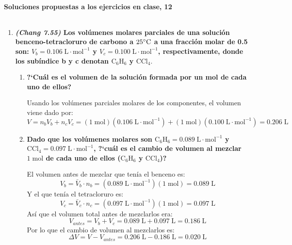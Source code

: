 \documentclass[a4paper,12pt]{article}
\begin{document}

\begin{center}
\HRule \\[0.4cm]
{ \bfseries Soluciones propuestas a los ejercicios en clase, 12}\\ %
\HRule \\[0.4cm]
\end{center}


\begin{enumerate}

 \item \textbf{\textit{(Chang 7.55)} Los vol\'umenes molares parciales de una soluci\'on benceno-tetracloruro de carbono a $25\celsius$ a una fracci\'on molar de 0.5 son: $V_b=0.106\;\mbox{L}\cdot\mbox{mol}^{-1}$ y $V_c=0.100\;\mbox{L}\cdot\mbox{mol}^{-1}$, respectivamente, donde los sub\'indice b y c denotan $\mbox{C}_6\mbox{H}_6$ y $\mbox{CCl}_4$}.
 \begin{enumerate}
  \item \textbf{?`Cu\'al es el volumen de la soluci\'on formada por un mol de cada uno de ellos?}

Usando los vol\'umenes parciales molares de los componentes, el volumen viene dado por:
$$V=n_bV_b+n_cV_c=(1\;\mbox{mol})(0.106\;\mbox{L}\cdot\mbox{mol}^{-1})+(1\;\mbox{mol})(0.100\;\mbox{L}\cdot\mbox{mol}^{-1})=0.206\;\mbox{L}$$

  \item \textbf{Dado que los vol\'umenes molares son $\mbox{C}_6\mbox{H}_6=0.089\;\mbox{L}\cdot\mbox{mol}^{-1}$ y $\mbox{CCl}_4=0.097\;\mbox{L}\cdot\mbox{mol}^{-1}$, ?`cu\'al es el cambio de volumen al mezclar $1\;\mbox{mol}$ de cada uno de ellos ($\mbox{C}_6\mbox{H}_6$ y $\mbox{CCl}_4$)?}

El volumen antes de mezclar que ten\'ia el benceno es: 
$$V_b=\bar{V}_b\cdot n_b=(0.089\;\mbox{L}\cdot\mbox{mol}^{-1})(1\;\mbox{mol})=0.089\;\mbox{L}$$ 
Y el que ten\'ia el tetracloruro es: 
$$V_c=\bar{V}_c\cdot n_c=(0.097\;\mbox{L}\cdot\mbox{mol}^{-1})(1\;\mbox{mol})=0.097\;\mbox{L}$$
As\'i que el volumen total antes de mezclarlos era:
$$V_{antes}=V_b+V_c=0.089\;\mbox{L}+0.097\;\mbox{L}=0.186\;\mbox{L}$$
Por lo que el cambio de volumen al mezclarlos es:
$$\Delta V=V-V_{antes}=0.206\;\mbox{L}-0.186\;\mbox{L}=0.020\;\mbox{L}$$


\end{enumerate}
\end{enumerate}
\end{document}

